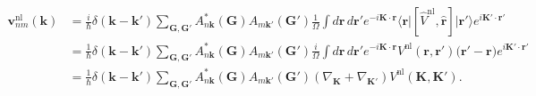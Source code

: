\begin{align}\label{vnln.2}
\mathbf{v}^\mathrm{nl}_{nm}(\mathbf{k})
&= \frac{i}{\hbar} \delta(\mathbf{k}-\mathbf{k}') \sum_{\mathbf{G},\mathbf{G}'} A^{*}_{n\mathbf{k}}(\mathbf{G}) A_{m\mathbf{k}'}(\mathbf{G}') \frac{1}{\Omega} \int d\mathbf{r}\,d\mathbf{r}'e^{-i\mathbf{K}\cdot\mathbf{r}} \langle\mathbf{r}\vert [\hat{V}^\mathrm{nl},\hat{\mathbf{r}}] \vert\mathbf{r}'\rangle e^{i\mathbf{K}'\cdot\mathbf{r}'} \nonumber\\ 
&= \frac{1}{\hbar} \delta(\mathbf{k}-\mathbf{k}') \sum_{\mathbf{G},\mathbf{G}'} A^{*}_{n\mathbf{k}}(\mathbf{G}) A_{m\mathbf{k}'}(\mathbf{G}') \frac{i}{\Omega} \int d\mathbf{r}\,d\mathbf{r}'e^{-i\mathbf{K}\cdot\mathbf{r}} V^\mathrm{nl}(\mathbf{r},\mathbf{r}') \big(\mathbf{r}'-\mathbf{r}\big) e^{i\mathbf{K}'\cdot\mathbf{r}'} \nonumber\\
&= \frac{1}{\hbar} \delta(\mathbf{k}-\mathbf{k}') \sum_{\mathbf{G},\mathbf{G}'} A^{*}_{n\mathbf{k}}(\mathbf{G}) A_{m\mathbf{k}'}(\mathbf{G}') (\nabla_\mathbf{K}+\nabla_{\mathbf{K}'}) V^\mathrm{nl}(\mathbf{K},\mathbf{K}') .
\end{align}  

